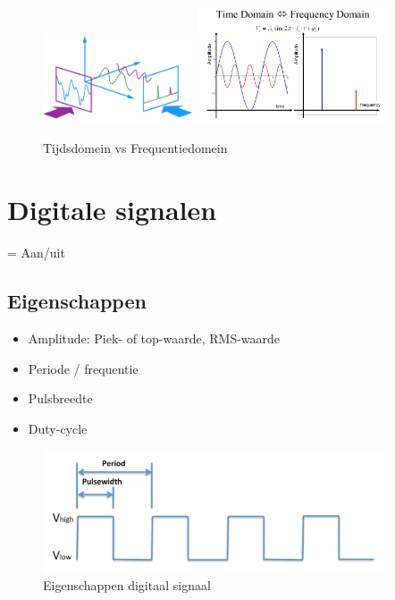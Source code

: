 \documentclass{article}
\begin{document}
\begin{figure}[H]
    \centering
    \centerline{
        \includegraphics[width=0.4\textwidth]{Screenshot_20200217_122108.png}
        \includegraphics[width=0.5\textwidth]{Screenshot_20200217_122246.png}    
    }
    \caption{Tijdsdomein vs Frequentiedomein}
\end{figure}

\section{Digitale signalen}
= Aan/uit

\subsection{Eigenschappen}
\begin{itemize}
    \item Amplitude: Piek- of top-waarde, RMS-waarde
    \item Periode / frequentie
    \item Pulsbreedte 
    \item Duty-cycle
\end{itemize}


\begin{figure}[H]
    \centering
    \includegraphics[width=0.9\textwidth]{Screenshot_20200315_120112.png}
    \caption{Eigenschappen digitaal signaal}
\end{figure}
\end{document}
